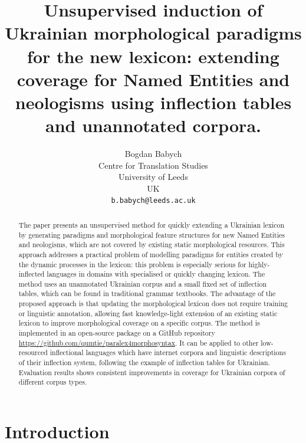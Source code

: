 \documentclass[11pt,a4paper]{article}
\title{Unsupervised induction of Ukrainian morphological paradigms for the new lexicon: extending coverage for Named Entities and neologisms using inflection tables and unannotated corpora.}
\author{Bogdan Babych \\
  Centre for Translation Studies \\
  University of Leeds \\
  UK \\
  \texttt{b.babych@leeds.ac.uk} \\ }
\date{}
\begin{document}
\maketitle
\begin{abstract}
	The paper presents an unsupervised method for quickly extending a Ukrainian lexicon by generating paradigms and morphological feature structures for new Named Entities and neologisms, which are not covered by existing static morphological resources. This approach addresses a practical problem of modelling paradigms for entities created by the dynamic processes in the lexicon: this problem is especially serious for highly-inflected languages in  domains with specialised or quickly changing lexicon. The method uses an unannotated Ukrainian corpus and a small fixed set of inflection tables, which can be found in traditional grammar textbooks. The advantage of the proposed approach is that updating the morphological lexicon does not require training or linguistic annotation, allowing fast knowledge-light extension of an existing static lexicon to improve morphological coverage on a specific corpus. The method is implemented in an open-source package on a GitHub repository \url{https://github.com/qumtie/paralex4morphosyntax}. It can be applied to other low-resourced inflectional languages which have internet corpora and linguistic descriptions of their inflection system, following the example of inflection tables for Ukrainian. Evaluation results shows consistent improvements in coverage for Ukrainian corpora of different corpus types.
	

\end{abstract}


\section{Introduction}
\end{document}
